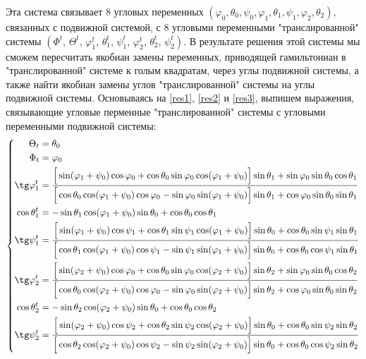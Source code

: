 \documentclass[14pt]{extarticle}
\newcommand{\lb}{\left(}
\newcommand{\rb}{\right)}
\begin{document}
Эта система связывает 8 угловых переменных $\lb \varphi_0, \theta_0, \psi_0, \varphi_1, \theta_1, \psi_1, \varphi_2, \theta_2 \rb$, связанных с подвижной системой, с 8 угловыми переменными "транслированной" системы $\lb \Phi^t \right.$, $\Theta^t$, $\varphi_1^t$, $\theta_1^t$, $\psi_1^t$, $\varphi_2^t$, $\theta_2^t$, $\left. \psi_2^t \rb$. В результате решения этой системы мы сможем пересчитать якобиан замены переменных, приводящей гамильтониан в "транслированной" системе к голым квадратам, через углы подвижной системы, а также найти якобиан замены углов "транслированной" системы на углы подвижной системы.
Основываясь на \eqref{res1}, \eqref{res2} и \eqref{res3}, выпишем выражения, связывающие угловые перменные "транслированной" системы с угловыми переменными подвижной системы:
\begin{gather}
	\left\{
	\begin{aligned}
		\Theta_t &= \theta_0 \\ 
		\Phi_t &= \varphi_0 \\
		\tg \varphi_1^t &= 
		\frac{
			\Big[ \sin (\varphi_1 + \psi_0) \cos \varphi_0 + \cos \theta_0 \sin \varphi_0 \cos( \varphi_1 + \psi_0) \Big] \sin \theta_1 + \sin \varphi_0 \sin \theta_0 \cos \theta_1
		}{
		 	\Big[ \cos \theta_0 \cos (\varphi_1 + \psi_0) \cos \varphi_0 - \sin \varphi_0 \sin (\varphi_1 + \psi_0) \Big] \sin \theta_1 + \cos \varphi_0 \sin \theta_0 \sin \theta_1  
		} \\
		\cos \theta_1^t &= - \sin \theta_1 \cos (\varphi_1 + \psi_0) \sin \theta_0 + \cos \theta_0 \cos \theta_1 \\
		\tg \psi_1^t &= \frac{
			\Big[ \sin( \varphi_1 + \psi_0) \cos \psi_1 + \cos \theta_1 \sin \psi_1 \cos (\varphi_1 + \psi_0) \Big] \sin \theta_0 + \cos \theta_0 \sin \psi_1 \sin \theta_1 
		}{
			\Big[ \cos \theta_1 \cos (\varphi_1 + \psi_0) \cos \psi_1 - \sin \psi_1 \sin(\varphi_1 + \psi_0) \Big] \sin \theta_0 + \cos \theta_0 \cos \psi_1 \sin \theta_1
		} \\
		\tg \varphi_2^t &= 
		\frac{
			\Big[ \sin (\varphi_2 + \psi_0) \cos \varphi_0 + \cos \theta_0 \sin \varphi_0 \cos( \varphi_2 + \psi_0) \Big] \sin \theta_2 + \sin \varphi_0 \sin \theta_0 \cos \theta_2
		}{
		 	\Big[ \cos \theta_0 \cos (\varphi_2 + \psi_0) \cos \varphi_0 - \sin \varphi_0 \sin (\varphi_2 + \psi_0) \Big] \sin \theta_2 + \cos \varphi_0 \sin \theta_0 \sin \theta_2  
		} \\
		\cos \theta_2^t &= - \sin \theta_2 \cos (\varphi_2 + \psi_0) \sin \theta_0 + \cos \theta_0 \cos \theta_2 \\
		\tg \psi_2^t &= \frac{
			\Big[ \sin( \varphi_2 + \psi_0) \cos \psi_2 + \cos \theta_2 \sin \psi_2 \cos (\varphi_2 + \psi_0) \Big] \sin \theta_0 + \cos \theta_0 \sin \psi_2 \sin \theta_2 
		}{
			\Big[ \cos \theta_2 \cos (\varphi_2 + \psi_0) \cos \psi_2 - \sin \psi_2 \sin(\varphi_2 + \psi_0) \Big] \sin \theta_0 + \cos \theta_0 \cos \psi_2 \sin \theta_2
		}
	\end{aligned}
	\right.
\end{gather}
\end{document}
